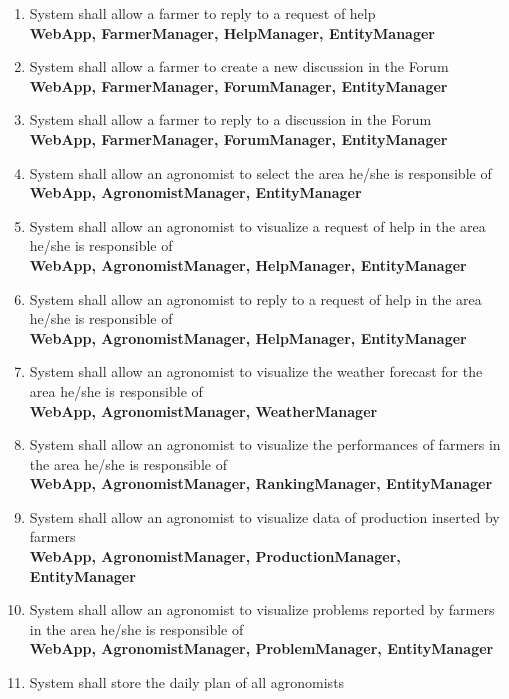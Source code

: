 \begin{enumerate} [label=\textbf{R.\arabic*}]
    \item System shall allow a farmer to reply to a request of help\\
        \textbf{WebApp, FarmerManager, HelpManager, EntityManager}
    \item System shall allow a farmer to create a new discussion in the Forum\\
        \textbf{WebApp, FarmerManager, ForumManager, EntityManager}
    \item System shall allow a farmer to reply to a discussion in the Forum\\
        \textbf{WebApp, FarmerManager, ForumManager, EntityManager}
    \item System shall allow an agronomist to select the area he/she is responsible of\\
        \textbf{WebApp, AgronomistManager, EntityManager}
    \item System shall allow an agronomist to visualize a request of help in the area he/she is responsible of\\
        \textbf{WebApp, AgronomistManager, HelpManager, EntityManager}
    \item System shall allow an agronomist to reply to a request of help in the area he/she is responsible of\\
        \textbf{WebApp, AgronomistManager, HelpManager, EntityManager}
    \item System shall allow an agronomist to visualize the weather forecast for the area he/she is responsible of\\
        \textbf{WebApp, AgronomistManager, WeatherManager}
    \item System shall allow an agronomist to visualize the performances of farmers in the area he/she is responsible of\\
        \textbf{WebApp, AgronomistManager, RankingManager, EntityManager}
    \item System shall allow an agronomist to visualize data of production inserted by farmers\\
        \textbf{WebApp, AgronomistManager, ProductionManager, EntityManager}
    \item System shall allow an agronomist to visualize problems reported by farmers in the area he/she is responsible of\\
        \textbf{WebApp, AgronomistManager, ProblemManager, EntityManager}
    \item System shall store the daily plan of all agronomists\\

\end{enumerate}
